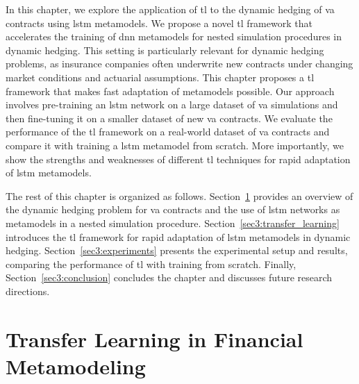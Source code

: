 In this chapter, we explore the application of \gls{tl} to the dynamic hedging of \gls{va} contracts using \gls{lstm} metamodels.
We propose a novel \gls{tl} framework that accelerates the training of \gls{dnn} metamodels for nested simulation procedures in dynamic hedging.
This setting is particularly relevant for dynamic hedging problems, as insurance companies often underwrite new contracts under changing market conditions and actuarial assumptions.
This chapter proposes a \gls{tl} framework that makes fast adaptation of metamodels possible.
Our approach involves pre-training an \gls{lstm} network on a large dataset of \gls{va} simulations and then fine-tuning it on a smaller dataset of new \gls{va} contracts.
We evaluate the performance of the \gls{tl} framework on a real-world dataset of \gls{va} contracts and compare it with training a \gls{lstm} metamodel from scratch.
More importantly, we show the strengths and weaknesses of different \gls{tl} techniques for rapid adaptation of \gls{lstm} metamodels.

The rest of this chapter is organized as follows.
Section~\ref{sec3:background} provides an overview of the dynamic hedging problem for \gls{va} contracts and the use of \gls{lstm} networks as metamodels in a nested simulation procedure.
Section~\ref{sec3:transfer_learning} introduces the \gls{tl} framework for rapid adaptation of \gls{lstm} metamodels in dynamic hedging.
Section~\ref{sec3:experiments} presents the experimental setup and results, comparing the performance of \gls{tl} with training from scratch.
Finally, Section~\ref{sec3:conclusion} concludes the chapter and discusses future research directions.

\section{Transfer Learning in Financial Metamodeling} \label{sec3:background}

